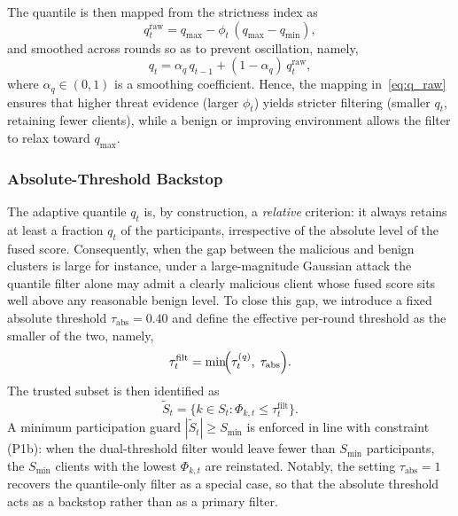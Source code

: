 \documentclass[journal]{IEEEtran}
\begin{document}
The quantile is then mapped from the strictness index as
\begin{equation}
q_t^{\mathrm{raw}} = q_{\max} - \phi_t\,(q_{\max} - q_{\min}),
\label{eq:q_raw}
\end{equation}
and smoothed across rounds so as to prevent oscillation, namely,
\begin{equation}
q_t = \alpha_q\, q_{t-1} + (1-\alpha_q)\, q_t^{\mathrm{raw}},
\label{eq:q_smooth}
\end{equation}
where $\alpha_q \in (0,1)$ is a smoothing coefficient. Hence, the mapping in~\eqref{eq:q_raw} ensures that higher threat evidence (larger $\phi_t$) yields stricter filtering (smaller $q_t$, retaining fewer clients), while a benign or improving environment allows the filter to relax toward $q_{\max}$.

\subsubsection{Absolute-Threshold Backstop}
The adaptive quantile $q_t$ is, by construction, a \emph{relative} criterion: it always retains at least a fraction $q_t$ of the participants, irrespective of the absolute level of the fused score. Consequently, when the gap between the malicious and benign clusters is large for instance, under a large-magnitude Gaussian attack the quantile filter alone may admit a clearly malicious client whose fused score sits well above any reasonable benign level. To close this gap, we introduce a fixed absolute threshold $\tau_{\mathrm{abs}} = 0.40$ and define the effective per-round threshold as the smaller of the two, namely,
\begin{equation}
\tau_t^{\mathrm{filt}} = \min\!\Bigl(\tau_t^{(q)},\; \tau_{\mathrm{abs}}\Bigr).
\label{eq:dual_thresh}
\end{equation}
The trusted subset is then identified as
\begin{equation}
\widetilde{S}_t = \bigl\{k \in S_t : \Phi_{k,t} \le \tau_t^{\mathrm{filt}}\bigr\}.
\label{eq:filtered_set}
\end{equation}
A minimum participation guard $|\widetilde{S}_t| \ge S_{\min}$ is enforced in line with constraint (P1b): when the dual-threshold filter would leave fewer than $S_{\min}$ participants, the $S_{\min}$ clients with the lowest $\Phi_{k,t}$ are reinstated. Notably, the setting $\tau_{\mathrm{abs}}=1$ recovers the quantile-only filter as a special case, so that the absolute threshold acts as a backstop rather than as a primary filter.
\end{document}
